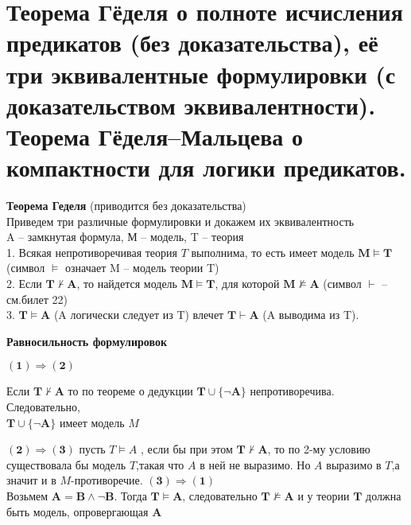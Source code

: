 \section{Теорема Гёделя о полноте исчисления предикатов (без доказательства), её
три эквивалентные формулировки (с доказательством эквивалентности).
Теорема Гёделя–Мальцева о компактности для логики предикатов.}
\begin{theorem}
    \textbf{Теорема Геделя} (приводится без доказательства)\\
    Приведем три различные формулировки и докажем их эквивалентность\\
    A -- замкнутая формула, М -- модель, T -- теория\\
    1. Всякая непротиворечивая теория $T$ выполнима, то есть имеет модель $\boldsymbol{M}\models \boldsymbol{T}$ (символ $\models$ означает M -- модель теории T)\\
    2. Если $ \boldsymbol{T} \nvdash \boldsymbol{A}$, то найдется модель $\boldsymbol{M}\models \boldsymbol{T}$, для которой $\boldsymbol{M} \nvDash \boldsymbol{A}$ (символ $\vdash$ -- см.билет 22)\\
    3. $\boldsymbol{T}\models \boldsymbol{A}$ (A логически следует из T) влечет $ \boldsymbol{T} \vdash \boldsymbol{A}$ (A выводима из T).
\end{theorem}

\textbf{Равносильность формулировок}

    $\boldsymbol{(1)}\Rightarrow \boldsymbol{(2)}$
    
    Если $ \boldsymbol{T} \nvdash \boldsymbol{A}$ то по теореме о дедукции $\boldsymbol{T} \cup \{\neg \boldsymbol{A}\}$ непротиворечива.
    Следовательно, \\$\boldsymbol{T} \cup \{\neg \boldsymbol{A}\}$ имеет модель $M$
    
    $\boldsymbol{(2)}\Rightarrow \boldsymbol{(3)}$
    пусть $T\vDash A$ , если бы при этом $ \boldsymbol{T} \nvdash \boldsymbol{A}$, то по 2-му условию существовала бы модель $T$,такая что $A$ в ней не выразимо. Но $A$ выразимо в $T$,а значит и в $M$-противоречие.
    $\boldsymbol{(3)}\Rightarrow \boldsymbol{(1)}$\\
    Возьмем $\boldsymbol{A} = \boldsymbol{B} \wedge \neg \boldsymbol{B} $. Тогда $\boldsymbol{T}\models \boldsymbol{A}$, следовательно $\boldsymbol{T} \nvDash \boldsymbol{A}$ и у теории $\boldsymbol{T}$ должна быть модель, опровергающая $\boldsymbol{A}$

